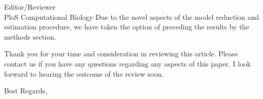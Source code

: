 \documentclass[a4paper,10pt]{letter}
\begin{document}
\begin{letter}{Editor/Reviewer \\ PloS Computational Biology}
Due to the novel aspects of the model reduction and estimation procedure, we have taken the option of preceding the results by the methods section.

Thank you for your time and consideration in reviewing this article. Please contact us if you have any questions regarding any aspects of this paper. I look forward to hearing the outcome of the review soon.

\closing{Best Regards,}

% 
\end{letter}
\end{document}
